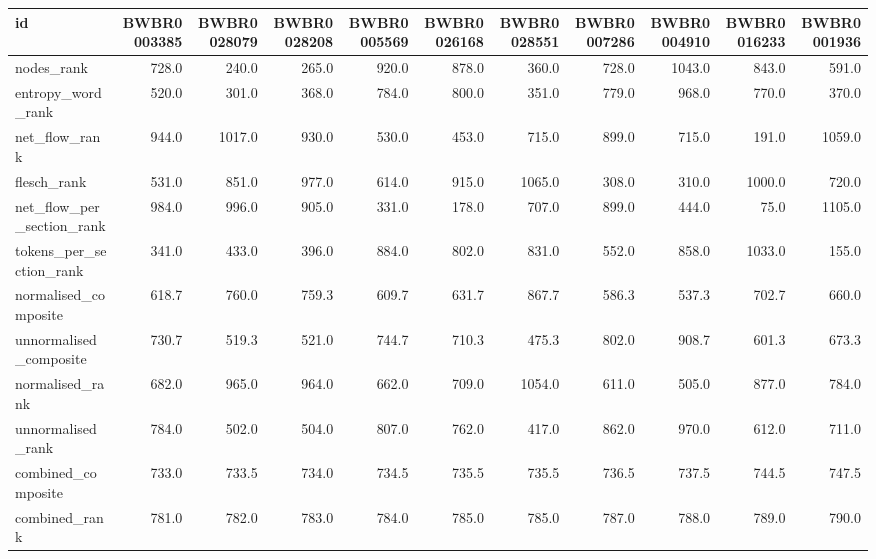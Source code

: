 \begin{tabular}{lrrrrrrrrrr}
\toprule
id & BWBR0003385 & BWBR0028079 & BWBR0028208 & BWBR0005569 & BWBR0026168 & BWBR0028551 & BWBR0007286 & BWBR0004910 & BWBR0016233 & BWBR0001936 \\
\midrule
nodes\_rank & 728.0 & 240.0 & 265.0 & 920.0 & 878.0 & 360.0 & 728.0 & 1043.0 & 843.0 & 591.0 \\
\cline{1-11}
entropy\_word\_rank & 520.0 & 301.0 & 368.0 & 784.0 & 800.0 & 351.0 & 779.0 & 968.0 & 770.0 & 370.0 \\
\cline{1-11}
net\_flow\_rank & 944.0 & 1017.0 & 930.0 & 530.0 & 453.0 & 715.0 & 899.0 & 715.0 & 191.0 & 1059.0 \\
\cline{1-11}
flesch\_rank & 531.0 & 851.0 & 977.0 & 614.0 & 915.0 & 1065.0 & 308.0 & 310.0 & 1000.0 & 720.0 \\
\cline{1-11}
net\_flow\_per\_section\_rank & 984.0 & 996.0 & 905.0 & 331.0 & 178.0 & 707.0 & 899.0 & 444.0 & 75.0 & 1105.0 \\
\cline{1-11}
tokens\_per\_section\_rank & 341.0 & 433.0 & 396.0 & 884.0 & 802.0 & 831.0 & 552.0 & 858.0 & 1033.0 & 155.0 \\
\cline{1-11}
normalised\_composite & 618.7 & 760.0 & 759.3 & 609.7 & 631.7 & 867.7 & 586.3 & 537.3 & 702.7 & 660.0 \\
\cline{1-11}
unnormalised\_composite & 730.7 & 519.3 & 521.0 & 744.7 & 710.3 & 475.3 & 802.0 & 908.7 & 601.3 & 673.3 \\
\cline{1-11}
normalised\_rank & 682.0 & 965.0 & 964.0 & 662.0 & 709.0 & 1054.0 & 611.0 & 505.0 & 877.0 & 784.0 \\
\cline{1-11}
unnormalised\_rank & 784.0 & 502.0 & 504.0 & 807.0 & 762.0 & 417.0 & 862.0 & 970.0 & 612.0 & 711.0 \\
\cline{1-11}
combined\_composite & 733.0 & 733.5 & 734.0 & 734.5 & 735.5 & 735.5 & 736.5 & 737.5 & 744.5 & 747.5 \\
\cline{1-11}
combined\_rank & 781.0 & 782.0 & 783.0 & 784.0 & 785.0 & 785.0 & 787.0 & 788.0 & 789.0 & 790.0 \\
\cline{1-11}
\bottomrule
\end{tabular}
